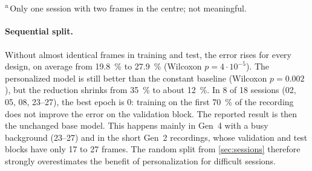 \begin{table}[htbp]
  \centering
  \caption[Test error per screen region]{Test error per screen region (\cref{sec:partition}, $r=0.15$),
           mean over the sessions of a design; in brackets the total number of
           test frames in the region. Base model .}
  \label{tab:region_errors}
  \footnotesize
  \setlength{\tabcolsep}{3.5pt}
  \\[1mm]
  \parbox{0.95\linewidth}{\footnotesize \textsuperscript{a}\,Only one session with
  two frames in the centre; not meaningful.}
\end{table}

\paragraph{Sequential split.} Without almost identical frames in training and
test, the error rises for every design, on average from \SI{19.8}{\percent} to
\SI{27.9}{\percent} (Wilcoxon $p=4\cdot10^{-5}$). The personalized model is
still better than the constant baseline (Wilcoxon $p=0.002$), but the reduction
shrinks from \SI{35}{\percent} to about \SI{12}{\percent}. In 8 of 18 sessions
(02, 05, 08, 23--27), the best epoch is 0: training on the first
\SI{70}{\percent} of the recording does not improve the error on the validation
block. The reported result is then the unchanged base model. This happens mainly
in Gen~4 with a busy background (23--27) and in the short Gen~2 recordings,
whose validation and test blocks have only 17 to 27 frames. The random split
from \cref{sec:sessions} therefore strongly overestimates the benefit of
personalization for difficult sessions.

